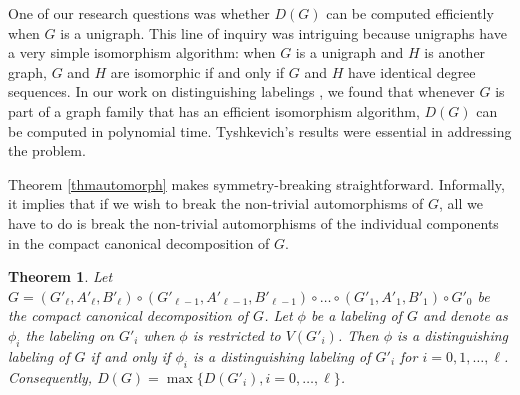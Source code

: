 \documentclass[11pt]{article}
\newtheorem{theorem}[df]{Theorem}
\begin{document}
 
  
 One of our research questions was whether $D(G)$ can be computed efficiently when $G$ is a unigraph.  This line of inquiry was intriguing  because unigraphs have a very simple isomorphism algorithm:  when $G$ is a unigraph and $H$ is another graph, $G$ and $H$ are isomorphic if and only if $G$ and $H$ have identical degree sequences.  In our work on distinguishing labelings \cite{Ch06, ArChDe08, Ch09}, we found that whenever $G$ is part of a graph family that has an efficient isomorphism algorithm,  $D(G)$ can be computed in polynomial time.  Tyshkevich's results were essential in addressing the problem.
  
Theorem \ref{thmautomorph} makes symmetry-breaking straightforward. Informally, it implies that if we wish
to break the non-trivial automorphisms of $G$, all we have to do is break the non-trivial automorphisms of the individual
components in the compact canonical decomposition of $G$.



\begin{theorem} {\bf \cite{Ch25}}
Let $G= (G'_\ell , A'_\ell, B'_\ell) \circ (G'_{\ell-1}, A'_{\ell-1}, B'_{\ell-1})  \circ \hdots \circ (G'_1, A'_1, B'_1) \circ G'_0$ be the compact canonical decomposition of $G$.  Let $\phi$ be a labeling of $G$ and denote as $\phi_i$ the labeling on $G'_i$ when $\phi$ is restricted to $V(G'_i)$.   Then $\phi$ is a distinguishing labeling of $G$ if and only if $\phi_i$ is a distinguishing labeling of $G'_i$ for $i = 0, 1, \hdots, \ell$.  Consequently, $D(G) = \max \{D(G'_i), i = 0, \hdots, \ell\}$.
\label{distthm}
\end{theorem}
\end{document}
